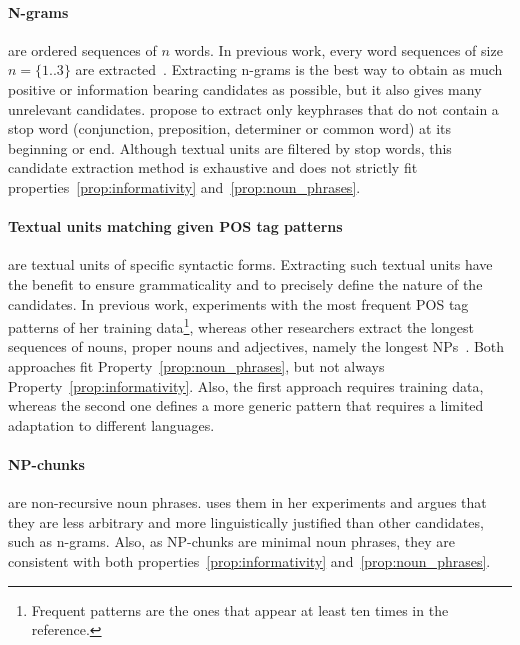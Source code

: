   \paragraph{N-grams} are ordered sequences of $n$ words. In previous work,
  every word sequences of size $n = \{1..3\}$ are
  extracted~\cite{witten1999kea,turney1999learningalgorithms,hulth2003keywordextraction}.
  Extracting n-grams is the best way to obtain as much positive or information
  bearing candidates as possible, but it also gives many unrelevant candidates.
   propose to extract only keyphrases that do not
  contain a stop word (conjunction, preposition, determiner or common word) at
  its beginning or end. Although textual units are filtered by stop words, this
  candidate extraction method is exhaustive and does not strictly fit
  properties~\ref{prop:informativity} and~\ref{prop:noun_phrases}.

  \paragraph{Textual units matching given POS tag patterns} are textual units of
  specific syntactic forms. Extracting such textual units have the benefit to
  ensure grammaticality and to precisely define the nature of the
  candidates. In previous work,  experiments
  with the most frequent POS tag patterns of her training data\footnote{Frequent
  patterns are the ones that appear at least ten times in the reference.},
  whereas other researchers extract the longest sequences of nouns, proper nouns
  and adjectives, namely the longest NPs~\cite{hassan2010conundrums}. Both
  approaches fit Property~\ref{prop:noun_phrases}, but not always
  Property~\ref{prop:informativity}. Also, the first approach requires training
  data, whereas the second one defines a more generic pattern that requires a
  limited adaptation to different languages.

  \paragraph{NP-chunks} are non-recursive noun phrases.
   uses them in her experiments and argues
  that they are less arbitrary and more linguistically justified than other
  candidates, such as n-grams. Also, as NP-chunks are minimal noun phrases,
  they are consistent with both properties~\ref{prop:informativity}
  and~\ref{prop:noun_phrases}.

